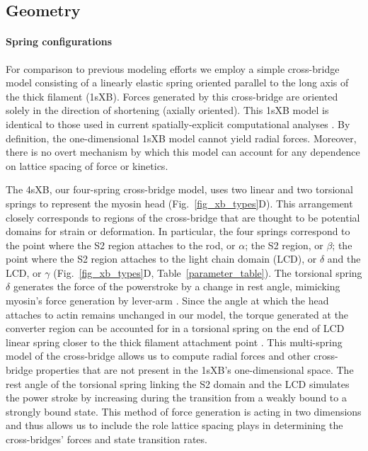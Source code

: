 \documentclass[]{article}
\begin{document}
\subsection*{Geometry} %

\paragraph{Spring configurations} %
For comparison to previous modeling efforts we employ a simple cross-bridge model consisting of a linearly elastic spring oriented parallel to the long axis of the thick filament (1sXB).  
Forces generated by this cross-bridge are oriented solely in the direction of shortening (axially oriented). 
This 1sXB model is identical to those used in current spatially-explicit computational analyses \citep{Daniel1998, Chase2004, Tanner2007}. 
By definition, the one-dimensional 1sXB model cannot yield radial forces.  
Moreover, there is no overt mechanism by which this model can account for any dependence on lattice spacing of force or kinetics.

The 4sXB, our four-spring cross-bridge model, uses two linear and two torsional springs to represent the myosin head (Fig.~\ref{fig_xb_types}D).
This arrangement closely corresponds to regions of the cross-bridge that are thought to be potential domains for strain or deformation. 
In particular, the four springs correspond to the point where the S2 region attaches to the rod, or $\alpha$; the S2 region, or $\beta$; the point where the S2 region attaches to the light chain domain (LCD), or $\delta$ and the LCD, or $\gamma$ (Fig.~\ref{fig_xb_types}D, Table~\ref{parameter_table}). 
The torsional spring $\delta$ generates the force of the powerstroke by a change in rest angle, mimicking myosin's force generation by lever-arm \citep{Houdusse2000, Houdusse2001}. %
Since the angle at which the head attaches to actin remains unchanged in our model, the torque generated at the converter region can be accounted for in a torsional spring on the end of LCD linear spring closer to the thick filament attachment point \citep{Houdusse2000}. 
This multi-spring model of the cross-bridge allows us to compute radial forces and other cross-bridge properties that are not present in the 1sXB's one-dimensional space. 
The rest angle of the torsional spring linking the S2 domain and the LCD simulates the power stroke by increasing during the transition from a weakly bound to a strongly bound state.
This method of force generation is acting in two dimensions and thus allows us to include the role lattice spacing plays in determining the cross-bridges' forces and state transition rates.
\end{document}
